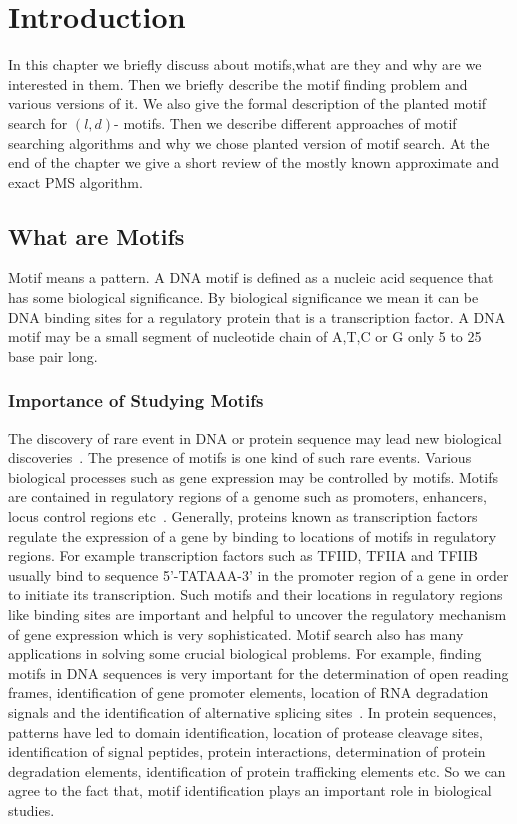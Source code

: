 \chapter{Introduction}\label{intro}
In this chapter we briefly discuss about motifs,what are they and why are we interested in them. Then we briefly describe the motif finding problem and various versions of it. We also give the formal description of the planted motif search for $ (l, d) $- motifs. Then we describe different approaches of motif searching algorithms and why we chose planted version of motif search. At the end of the chapter we give a short review of the mostly known approximate and exact PMS algorithm.


\section{What are Motifs}
Motif means a pattern. A DNA motif is defined as a nucleic acid sequence that has some biological significance. By biological significance we mean it can be DNA binding sites for a regulatory protein that is a transcription factor. A DNA motif may be a small segment of nucleotide chain of A,T,C or G only 5 to 25 base pair long.

\subsection{Importance of Studying Motifs}
The discovery of rare event in DNA or protein sequence may lead new biological discoveries~\cite{dinh2012qpms7}. The presence of motifs is one kind of such rare events. Various biological processes such as gene expression may be controlled by motifs. Motifs are contained in regulatory regions of a genome such as promoters, enhancers, locus control regions etc~\cite{duret1997searching}. Generally, proteins known as transcription factors regulate the expression of a gene by binding to locations of motifs in regulatory regions. For example transcription factors such as TFIID, TFIIA and TFIIB usually bind to sequence 5'-TATAAA-3' in the promoter region of a gene in order to initiate its transcription. Such motifs and their locations in regulatory regions like binding sites are important and helpful to uncover the regulatory mechanism of gene expression which is very sophisticated. Motif search also has many applications in solving some crucial biological problems. For example, finding motifs in DNA sequences is very important for the determination of open reading frames, identification of gene promoter elements, location of RNA degradation signals and the identification of alternative splicing sites~\cite{pal2016efficient}.
In protein sequences, patterns have led to domain identification, location of protease cleavage sites, identification of signal peptides, protein interactions, determination of protein degradation elements, identification of protein trafficking elements etc.  So we can agree to the fact that, motif identification plays an important role in biological studies.

